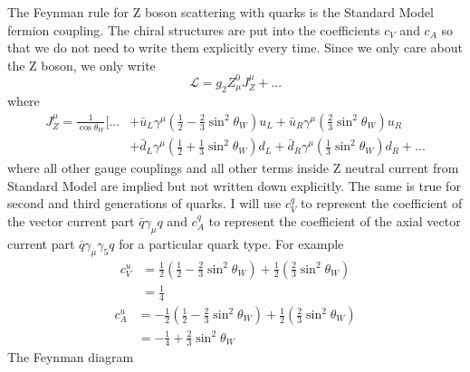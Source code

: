 \documentclass[12pt]{article}
\begin{document}
The Feynman rule for Z boson scattering with quarks is the Standard Model fermion coupling. 
The chiral structures are put into the coefficients $c_V$ and $c_A$ so that we do not need to write them explicitly every time. 
Since we only care about the Z boson, we only write
$$
\mathcal L = g_2 Z_\mu^0 J_Z^\mu  + ...
$$
where 
\begin{equation}
\begin{aligned}
 J_Z^\mu   = \frac{1}{\cos\theta_W} [ ... 
 &+ \bar u_L \gamma^\mu (\frac{1}{2} - \frac{2}{3} \sin^2 \theta_W ) u_L 
+ \bar u_R \gamma^\mu ( \frac{2}{3} \sin^2 \theta_W ) u_R \\
& + \bar d_L \gamma^\mu (\frac{1}{2} + \frac{1}{3} \sin^2 \theta_W ) d_L 
 + \bar d_R \gamma^\mu ( \frac{1}{3} \sin^2 \theta_W ) d_R + ...
 \end{aligned}
 \end{equation}
 where all other gauge couplings and all other terms inside Z neutral current from Standard Model are implied but not written down explicitly. The same is true for second and third generations of quarks. 
 I will use $c_V^q$ to represent the coefficient of the vector current part $\bar q \gamma_\mu q$ and $c_A^q$ to represent the coefficient of the axial vector current part $\bar q \gamma_\mu \gamma_5 q$ for a particular quark type.  
 For example
 \begin{equation}
 \begin{aligned}
 c_V^u 
 &
 = \frac{1}{2 }(\frac{1}{2} - \frac{2}{3} \sin^2 \theta_W ) +  \frac{1}{2}( \frac{2}{3} \sin^2 \theta_W )\\
 &= \frac{1}{4}
 \end{aligned}
  \end{equation}
  \begin{equation}
 \begin{aligned} c_A^u 
 &= - \frac{1}{2}(\frac{1}{2} - \frac{2}{3} \sin^2 \theta_W ) +  \frac{1}{2}( \frac{2}{3} \sin^2 \theta_W )\\
 &= - \frac{1}{4} + \frac{2}{3} \sin^2 \theta_W 
 \end{aligned}
   \end{equation}
The Feynman diagram

\begin{center}
\end{center}
\end{document}

